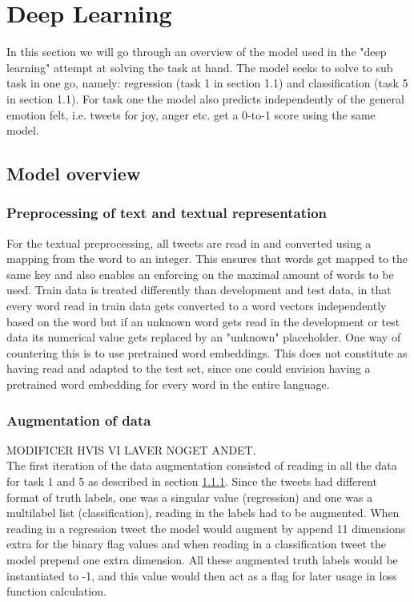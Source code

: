 
\section{Deep Learning}
In this section we will go through an overview of the model used in the "deep learning" attempt at solving the task at hand. The model seeks to solve to sub task in one go, namely: regression (task 1 in section 1.1) and classification (task 5 in section 1.1). For task one the model also predicts independently of the general emotion felt, i.e. tweets for joy, anger etc. get a 0-to-1 score using the same model.

\subsection{Model overview}

\subsubsection{Preprocessing of text and textual representation} \label{sec:preprop}
For the textual preprocessing, all tweets are read in and converted using a mapping from the word to an integer. This ensures that words get mapped to the same key and also enables an enforcing on the maximal amount of words to be used. Train data is treated differently than development and test data, in that every word read in train data gets converted to a word vectors independently based on the word but if an unknown word gets read in the development or test data its numerical value gets replaced by an "unknown" placeholder. One way of countering this is to use pretrained word embeddings. This does not constitute as having read and adapted to the test set, since one could envision having a pretrained word embedding for every word in the entire language.

\subsubsection*{Augmentation of data}
MODIFICER HVIS VI LAVER NOGET ANDET.\\
The first iteration of the data augmentation consisted of reading in all the data for task 1 and 5 as described in section \ref{sec:preprop}. Since the tweets had different format of truth labels, one was a singular value (regression) and one was a multilabel list (classification), reading in the labels had to be augmented. When reading in a regression tweet the model would augment by append 11 dimensions extra for the binary flag values and when reading in a classification tweet the model prepend one extra dimension. All these augmented truth labels would be instantiated to -1, and this value would then act as a flag for later usage in loss function calculation.

